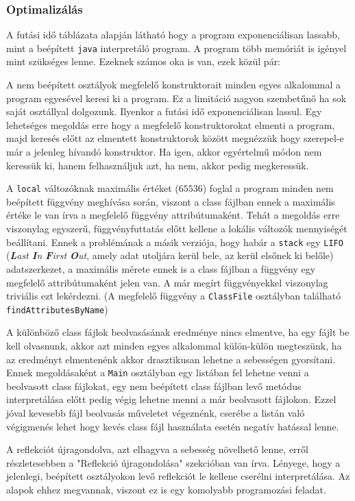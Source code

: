 \subsubsection{Optimalizálás}

A futási idő táblázata alapján látható hogy a program exponenciálisan lassabb, mint a beépített \lstinline{java} interpretáló program. A program több memóriát is igényel mint szükséges lenne. Ezeknek számos oka is van, ezek közül pár:

\begin{compactitem}
	\item A nem beépített osztályok megfelelő konstruktorait minden egyes alkalommal a program egyesével keresi ki a program. Ez a limitáció nagyon szembetűnő ha sok saját osztállyal dolgozunk. Ilyenkor a futási idő exponenciálisan lassul. Egy lehetséges megoldás erre hogy a megfelelő konstruktorokat elmenti a program, majd keresés előtt az elmentett konstruktorok között megnézzük hogy szerepel-e már a jelenleg hívandó konstruktor. Ha igen, akkor egyértelmű módon nem keressük ki, hanem felhasználjuk azt, ha nem, akkor pedig megkeressük.
	\item A \lstinline{local} változóknak maximális értéket ($65536$) foglal a program minden nem beépített függvény meghívása során, viszont a class fájlban ennek a maximális értéke le van írva a megfelelő függvény attribútumaként. Tehát a megoldás erre viszonylag egyszerű, függvényfuttatás előtt kellene a lokális változók mennyiségét beállítani. Ennek a problémának a másik verziója, hogy habár a \lstinline{stack} egy \lstinline{LIFO} (\textit{\textbf{L}ast \textbf{I}n \textbf{F}irst \textbf{O}ut}, amely adat utoljára kerül bele, az kerül elsőnek ki belőle) adatszerkezet, a maximális mérete ennek is a class fájlban a függvény egy megfelelő attribútumaként jelen van. A már megírt függvényekkel viszonylag triviális ezt lekérdezni. (A megfelelő függvény a \lstinline{ClassFile} osztályban található \lstinline{findAttributesByName})
	\item A különböző class fájlok beolvasásának eredménye nincs elmentve, ha egy fájlt be kell olvasnunk, akkor azt minden egyes alkalommal külön-külön megteszünk, ha az eredményt elmentenénk akkor drasztikusan lehetne a sebességen gyorsítani. Ennek megoldásaként a \lstinline{Main} osztályban egy listában fel lehetne venni a beolvasott class fájlokat, egy nem beépített class fájlban levő metódus interpretálása előtt pedig végig lehetne menni a már beolvasott fájlokon. Ezzel jóval kevesebb fájl beolvasás műveletet végeznénk, cserébe a listán való végigmenés lehet hogy kevés class fájl használata esetén negatív hatással lenne.
	\item A reflekciót újragondolva, azt elhagyva a sebesség növelhető lenne, erről részletesebben a "Reflekció újragondolása" szekcióban van írva. Lényege, hogy a jelenlegi, beépített osztályokon levő reflekciót le kellene cserélni interpretálása. Az alapok ehhez megvannak, viszont ez is egy komolyabb programozási feladat.
\end{compactitem}

